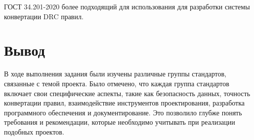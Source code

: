ГОСТ 34.201-2020 более подходящий для использования
для разработки системы конвертации DRC правил.

\clearpage

\section*{\LARGE Вывод}

В ходе выполнения задания были изучены различные группы стандартов,
связанные с темой проекта.
Было отмечено, что каждая группа стандартов включает
свои специфические аспекты,
такие как безопасность данных, точность конвертации правил,
взаимодействие инструментов проектирования,
разработка программного обеспечения и документирование.
Это позволило глубже понять требования и рекомендации,
которые необходимо учитывать при реализации подобных проектов.

